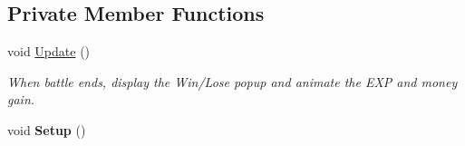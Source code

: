 \subsection*{Private Member Functions}
\begin{DoxyCompactItemize}
\item 
\mbox{\label{class_win_lose_popup_a9f1909bfd129a06cb0ff7048ccf19d0f}} 
void \mbox{\hyperlink{class_win_lose_popup_a9f1909bfd129a06cb0ff7048ccf19d0f}{Update}} ()
\begin{DoxyCompactList}\small\item\em When battle ends, display the Win/\+Lose popup and animate the E\+XP and money gain. \end{DoxyCompactList}\item 
\mbox{\label{class_win_lose_popup_a93530da059106189d5c41afff35bca9d}} 
void {\bfseries Setup} ()
\end{DoxyCompactItemize}
